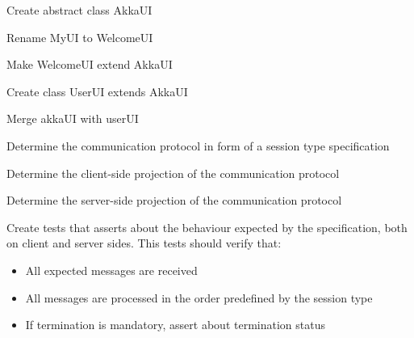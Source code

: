 \begin{feature}
%
  \begin{task}
    Create abstract class AkkaUI\\
  \end{task}
  \begin{task}
    Rename MyUI to WelcomeUI\\
  \end{task}
  \begin{task}
    Make WelcomeUI extend AkkaUI\\
  \end{task}
  \begin{task}
    Create class UserUI extends AkkaUI\\
  \end{task}
  \begin{task}
    Merge akkaUI with userUI\\
  \end{task}
%

  \begin{task}
    Determine the communication protocol in form of a session type
    specification\\
  \end{task}
  \begin{task}
    Determine the client-side projection of the communication
    protocol\\
  \end{task}
  \begin{task}
    Determine the server-side projection of the communication
    protocol\\
  \end{task}
%

  \begin{task}
    Create tests that asserts about the behaviour expected by the
    specification, both on client and server sides. This tests should
    verify that:
    \begin{itemize}
    \item All expected messages are received\\
    \item All messages are processed in the order predefined by the
      session type
    \item If termination is mandatory, assert about termination status
    \end{itemize}
  \end{task}




\end{feature}
